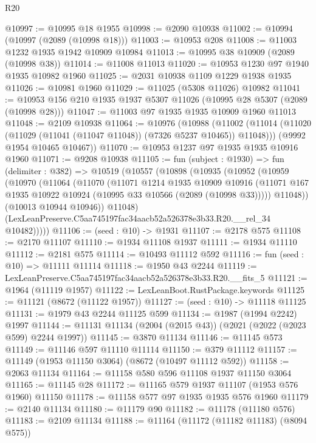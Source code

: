 \begin{lexlean}{R20}
\begin{coremodule}
@10997 := @10995 @18 @1955
@10998 := @2090 @10938
@11002 := @10994 (@10997 (@2089 (@10998 @18)))
@11003 := @10953 @208
@11008 := @11003 @1232 @1935 @1942 @10909 @10984
@11013 := @10995 @38 @10909 (@2089 (@10998 @38))
@11014 := @11008 @11013
@11020 := @10953 @1230 @97 @1940 @1935 @10982 @1960
@11025 := @2031 @10938 @1109 @1229 @1938 @1935
@11026 := @10981 @1960
@11029 := @11025 (@5308 @11026) @10982
@11041 := @10953 @156 @210 @1935 @1937 @5307 @11026 (@10995 @28 @5307 (@2089 (@10998 @28)))
@11047 := @11003 @97 @1935 @1935 @10909 @1960 @11013
@11048 := @2109 @10938
@11064 := @10976
    (@10988
      (@11002 (@11014 (@11020 (@11029 (@11041 (@11047 @11048)) (@7326 @5237 @10465)) @11048)))
      (@9992 @1954 @10465 @10467))
@11070 := @10953 @1237 @97 @1935 @1935 @10916 @1960
@11071 := @9208 @10938
@11105 := fun (subject : @1930) =>
  fun (delimiter : @382) =>
  @10519
    (@10557
      (@10898
        (@10935
          (@10952
            (@10959
              (@10970
                (@11064
                  (@11070
                    (@11071
                      @1214
                      @1935
                      @10909
                      @10916
                      (@11071 @167 @1935 @10922 @10924 (@10995 @33 @10566 (@2089 (@10998 @33)))))
                    @11048))
                (@10013 @10944 @10946))
              @11048)
            (LexLeanPreserve.C5aa745197fac34aacb52a526378e3b33.R20.__rel_34 @10482)))))
@11106 := (seed : @10) -> @1931
@11107 := @2178 @575
@11108 := @2170 @11107
@11110 := @1934 @11108 @1937
@11111 := @1934 @11110
@11112 := @2181 @575
@11114 := @10493 @11112 @592
@11116 := fun (seed : @10) => @11111 @11114
@11118 := @1950 @43 @2244
@11119 := LexLeanPreserve.C5aa745197fac34aacb52a526378e3b33.R20.__fits_5
@11121 := @1964 (@11119 @1957)
@11122 := LexLeanBoot.RustPackage.keywords
@11125 := @11121 (@8672 (@11122 @1957))
@11127 := (seed : @10) -> @11118 @11125
@11131 := @1979 @43 @2244 @11125 @599
@11134 := @1987 (@1994 @2242) @1997
@11144 := @11131 @11134 (@2004 (@2015 @43)) (@2021 (@2022 (@2023 @599) @2244 @1997))
@11145 := @3870 @11134
@11146 := @11145 @573
@11149 := @11146 @597 @11110 @11114
@11150 := @379 @11112
@11157 := @11149 (@1953 @11150 @3064) (@8672 (@10497 @11112 @592))
@11158 := @2063 @11134
@11164 := @11158 @580 @596 @11108 @1937 @11150 @3064
@11165 := @11145 @28
@11172 := @11165 @579 @1937 @11107 (@1953 @576 @1960) @11150
@11178 := @11158 @577 @97 @1935 @1935 @576 @1960
@11179 := @2140 @11134
@11180 := @11179 @90
@11182 := @11178 (@11180 @576)
@11183 := @2109 @11134
@11188 := @11164 (@11172 (@11182 @11183) (@8094 @575))

\end{coremodule}
\end{lexlean}
